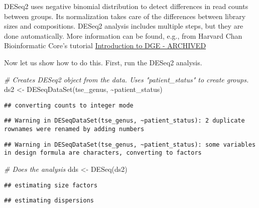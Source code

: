 \documentclass[
]{book}
\newenvironment{Shaded}{\begin{snugshade}}{\end{snugshade}}
\newcommand{\CommentTok}[1]{\textcolor[rgb]{0.56,0.35,0.01}{\textit{#1}}}
\newcommand{\FunctionTok}[1]{\textcolor[rgb]{0.00,0.00,0.00}{#1}}
\newcommand{\NormalTok}[1]{#1}
\newcommand{\OtherTok}[1]{\textcolor[rgb]{0.56,0.35,0.01}{#1}}
\newcommand{\SpecialCharTok}[1]{\textcolor[rgb]{0.00,0.00,0.00}{#1}}
\begin{document}
DESeq2 uses negative binomial distribution to detect differences in
read counts between groups. Its normalization takes care of the
differences between library sizes and compositions. DESeq2 analysis
includes multiple steps, but they are done automatically. More
information can be found, e.g., from Harvard Chan Bioinformatic Core's
tutorial \href{https://hbctraining.github.io/DGE_workshop/lessons/04_DGE_DESeq2_analysis.html}{Introduction to DGE -
ARCHIVED}

Now let us show how to do this. First, run the DESeq2 analysis.

\begin{Shaded}
\begin{Highlighting}[]
\CommentTok{\# Creates DESeq2 object from the data. Uses "patient\_status" to create groups. }
\NormalTok{ds2 }\OtherTok{\textless{}{-}} \FunctionTok{DESeqDataSet}\NormalTok{(tse\_genus, }\SpecialCharTok{\textasciitilde{}}\NormalTok{patient\_status)}
\end{Highlighting}
\end{Shaded}

\begin{verbatim}
## converting counts to integer mode
\end{verbatim}

\begin{verbatim}
## Warning in DESeqDataSet(tse_genus, ~patient_status): 2 duplicate rownames were renamed by adding numbers
\end{verbatim}

\begin{verbatim}
## Warning in DESeqDataSet(tse_genus, ~patient_status): some variables in design formula are characters, converting to factors
\end{verbatim}

\begin{Shaded}
\begin{Highlighting}[]
\CommentTok{\# Does the analysis}
\NormalTok{dds }\OtherTok{\textless{}{-}} \FunctionTok{DESeq}\NormalTok{(ds2)}
\end{Highlighting}
\end{Shaded}

\begin{verbatim}
## estimating size factors
\end{verbatim}

\begin{verbatim}
## estimating dispersions
\end{verbatim}
\end{document}
